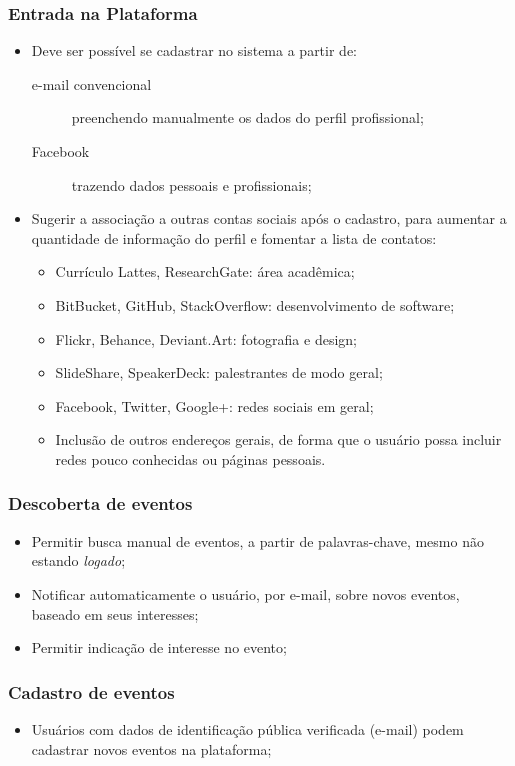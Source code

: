 \documentclass[12pt,a4paper,twoside,hyphens,english,brazil]{abntex2}
\begin{document}
\subsubsection*{Entrada na Plataforma}
\begin{itemize}
\item Deve ser possível se cadastrar no sistema a partir de:
	\begin{description}
		\item[e-mail convencional] preenchendo manualmente os dados do perfil profissional;
		\item[Facebook] trazendo dados pessoais e profissionais;
	\end{description}
\item Sugerir a associação a outras contas sociais após o cadastro, para aumentar a quantidade de informação do perfil e fomentar a lista de contatos:
	\begin{itemize}[itemsep=-1ex]
		\item Currículo Lattes, ResearchGate: área acadêmica;
		\item BitBucket, GitHub, StackOverflow: desenvolvimento de software;
		\item Flickr, Behance, Deviant.Art: fotografia e design;
		\item SlideShare, SpeakerDeck: palestrantes de modo geral;
		\item Facebook, Twitter, Google+: redes sociais em geral;
		\item Inclusão de outros endereços gerais, de forma que o usuário possa incluir redes pouco conhecidas ou páginas pessoais.
	\end{itemize}
\end{itemize}

\subsubsection*{Descoberta de eventos}
\begin{itemize}
	\item Permitir busca manual de eventos, a partir de palavras-chave, mesmo não estando \textit{logado};
	\item Notificar automaticamente o usuário, por e-mail, sobre novos eventos, baseado em seus interesses;
	\item Permitir indicação de interesse no evento;
\end{itemize}

\subsubsection*{Cadastro de eventos}
\begin{itemize}
	\item Usuários com dados de identificação pública verificada (e-mail) podem cadastrar novos eventos na plataforma;
\end{itemize}
\end{document}
